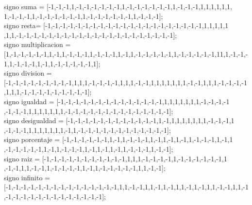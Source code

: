 \documentclass[letterpaper,12pt]{article}
\begin{document}
\begin{tcolorbox}
[colback=red!5!white,colframe=red!75!black,width=15cm ,fonttitle=\bfseries,title=Código  Hopfield Matlab ]

signo suma = [-1,-1,-1,1,-1,-1,-1,-1,-1,-1,1,-1,-1,-1,-1,-1,-1,1,-1,-1,-1,1,1,1,1,1,1,\\1,-1,-1,-1,1,-1,-1,-1,-1,-1,-1,1,-1,-1,-1,-1,-1,-1,1,-1,-1,-1];\\               

signo resta= [-1,-1,-1,-1,-1,-1,-1,-1,-1,-1,-1,-1,-1,-1,-1,-1,-1,-1,-1,-1,-1,1,1,1,1,1\\,1,1,-1,-1,-1,-1,-1,-1,-1,-1,-1,-1,-1,-1,-1,-1,-1,-1,-1,-1,-1,-1,-1];\\

signo multiplicacion = [1,-1,-1,-1,-1,-1,1,-1,1,-1,-1,-1,1,-1,-1,-1,1,-1,1,-1,-1,-1,-1,-1,1,-1,-1,-1,-1,-1,11,1,-1,-1,-1,1,-1,-1,-1,1,-1,1,-1,-1,-1,-1,-1,1];\\

signo division = 
[-1,-1,-1,-1,-1,-1,-1,-1,-1,1,1,1,-1,-1,-1,-1,1,1,1,-1,-1,1,1,1,1,1,1,1,-1,-1,1,1,1,-1,-1,-1,-1,1,1,1,-1,-1,-1,-1,-1,-1,-1,-1,-1];\\

signo igualdad = [-1,-1,-1,-1,-1,-1,-1,-1,-1,-1,-1,-1,-1,-1,1,1,1,1,1,1,1,-1,-1,-1,-1\\,-1,-1,-1,1,1,1,1,1,1,1,-1,-1,-1,-1,-1,-1,-1,-1,-1,-1,-1,-1,-1,-1];\\

signo desigualdad = [-1,-1,-1,-1,-1,-1,-1,-1,-1,-1,-1,-1,1,-1,1,1,1,1,1,1,1,-1,-1,-1,1\\,-1,-1,-1,1,1,1,1,1,1,1,-1,1,-1,-1,-1,-1,-1,-1,-1,-1,-1,-1,-1,-1];\\

signo porcentaje = [-1,-1,-1,-1,-1,-1,1,-1,1,-1,-1,-1,1,-1,1,-1,1,-1,1,-1,-1,-1,1,-1,1\\,-1,-1,-1,-1,-1,1,-1,1,-1,-1,-1,1,-1,1,-1,1,-1,1,-1,-1,-1,1,-1,-1];\\

signo raiz = [-1,-1,-1,-1,-1,-1,-1,-1,-1,-1,-1,1,1,1,-1,-1,-1,-1,1,-1,-1,-1,-1,-1,-1,1\\,-1,-1,1,1,-1,-1,1,-1,-1,-1,-1,1,-1,1,-1,-1,-1,-1,-1,1,1,-1,-1];\\

signo infinito = 
[-1,-1,-1,-1,-1,-1,-1,-1,-1,-1,-1,-1,-1,-1,-1,1,1,-1,-1,1,1,-1,1,-1,1,1,-1,1,-1,1,1,-1,-1,1,1,-1,-1,-1,-1,-1,-1,-1,-1,-1,-1,-1,-1,-1,-1];\\



\end{tcolorbox}
\end{document}
